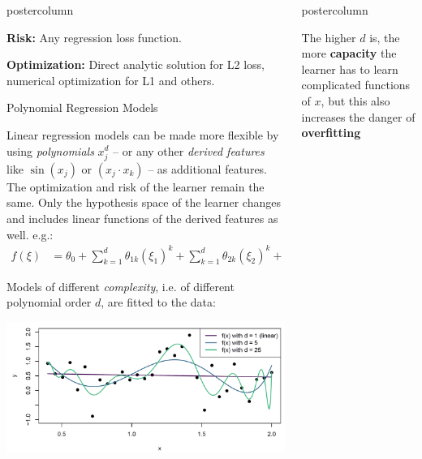\documentclass{beamer}
\begin{document}
\begin{frame}[fragile]{}
\begin{columns}
\begin{column}{.31\textwidth}
\begin{beamercolorbox}[center]{postercolumn}
\begin{minipage}{.98\textwidth}
{\begin{myblock}{ }
  \vspace*{1ex}
  
  \textbf{Risk:} Any regression loss function.
  
  \vspace*{1ex}
  
  \textbf{Optimization:} Direct analytic solution for L2 loss, numerical optimization for L1 and others.
  \end{myblock}
  
  \begin{myblock}{Polynomial Regression Models}
  
  Linear regression models can be made more flexible by using \emph{polynomials} $x_j^d$ -- or any other \emph{derived features} like $\sin(x_j)$ or $(x_j \cdot x_k)$ -- as additional features. The optimization and risk of the learner remain the same.\vspace*{1ex}
  Only the hypothesis space of the learner changes and includes linear functions of the derived features as well. e.g.:
    \begin{align*}
  f(\xi) &= \theta_0 + \sum^d_{k=1} \theta_{1k} \left(\xi_1\right)^k + \sum^d_{k=1} \theta_{2k} \left(\xi_2\right)^k + \dots
  \end{align*}
  
  Models of different \emph{complexity}, i.e. of different polynomial order $d$, are fitted to the data:
  
  \includegraphics[width=0.91\columnwidth]{img/poly_reg.PNG}
  
  \end{myblock}
}
\end{minipage}
\end{beamercolorbox}
\end{column}
\begin{column}{.31\textwidth}
\begin{beamercolorbox}[center]{postercolumn}
\begin{minipage}{.98\textwidth}
\parbox[t][\columnheight]{\textwidth}{
  \begin{myblock}{ }
  The higher $d$ is, the more \textbf{capacity} the learner has to learn complicated functions of $x$, but
  this also increases the danger of \textbf{overfitting}
  

\end{myblock}}
\end{minipage}
\end{beamercolorbox}
\end{column}
\end{columns}
\end{frame}
\end{document}
